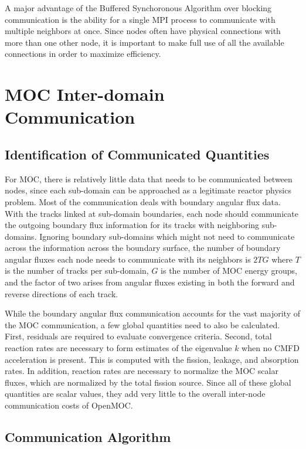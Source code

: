 A major advantage of the Buffered Synchoronous Algorithm over blocking communication is the ability for a single \ac{MPI} process to communicate with multiple neighbors at once. Since nodes often have physical connections with more than one other node, it is important to make full use of all the available connections in order to maximize efficiency.


\section{MOC Inter-domain Communication}
\label{sec:moc-dd}

\subsection{Identification of Communicated Quantities}

For \ac{MOC}, there is relatively little data that needs to be communicated between nodes, since each sub-domain can be approached as a legitimate reactor physics problem. Most of the communication deals with boundary angular flux data. With the tracks linked at sub-domain boundaries, each node should communicate the outgoing boundary flux information for its tracks with neighboring sub-domains. Ignoring boundary sub-domains which might not need to communicate across the information across the boundary surface, the number of boundary angular fluxes each node needs to communicate with its neighbors is $2TG$ where $T$ is the number of tracks per sub-domain, $G$ is the number of \ac{MOC} energy groups, and the factor of two arises from angular fluxes existing in both the forward and reverse directions of each track.

While the boundary angular flux communication accounts for the vast majority of the \ac{MOC} communication, a few global quantities need to also be calculated. First, residuals are required to evaluate convergence criteria. Second, total reaction rates are necessary to form estimates of the eigenvalue $k$ when no  \ac{CMFD} acceleration is present. This is computed with the fission, leakage, and absorption rates. In addition, reaction rates are necessary to normalize the \ac{MOC} scalar fluxes, which are normalized by the total fission source. Since all of these global quantities are scalar values, they add very little to the overall inter-node communication costs of OpenMOC.

\subsection{Communication Algorithm}

